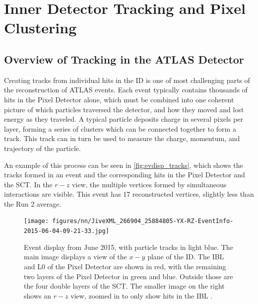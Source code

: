 
\chapter{Inner Detector Tracking and Pixel Clustering} %

\label{sec:NN} %



\section{Overview of Tracking in the ATLAS Detector}
\label{sec:tracking}

Creating tracks from individual hits in the \ac{ID} is one of most challenging parts of the reconstruction of \ac{ATLAS} events. Each event typically contains thousands of hits in the Pixel Detector alone, which must be combined into one coherent picture of which particles traversed the detector, and how they moved and lost energy as they traveled. A typical particle deposits charge in several pixels per layer, forming a series of clusters which can be connected together to form a track. This track can in turn be used to measure the charge, momentum, and trajectory of the particle. 

An example of this process can be seen in \autoref{fig:evdisp_tracks}, which shows the tracks formed in an event and the corresponding hits in the Pixel Detector and the \ac{SCT}. In the $r-z$ view, the multiple vertices formed by simultaneous interactions are visible. This event has 17 reconstructed vertices, slightly less than the Run 2 average. 

\begin{centering}
\begin{figure}[bth]
\myfloatalign
\texttt{[image: figures/nn/JiveXML\_266904\_25884805-YX-RZ-EventInfo-2015-06-04-09-21-33.jpg]}
\caption{ Event display from June 2015, with particle tracks in light blue. The main image displays a view of the $x-y$ plane of the \ac{ID}. The \ac{IBL} and L0 of the Pixel Detector are shown in red, with the remaining two layers of the Pixel Detector in green and blue. Outside those are the four double layers of the \ac{SCT}. The smaller image on the right shows an $r-z$ view, zoomed in to only show hits in the \ac{IBL} \cite{Collaboration:2022202}.}
\label{fig:evdisp_tracks}
\end{figure}
\end{centering}

